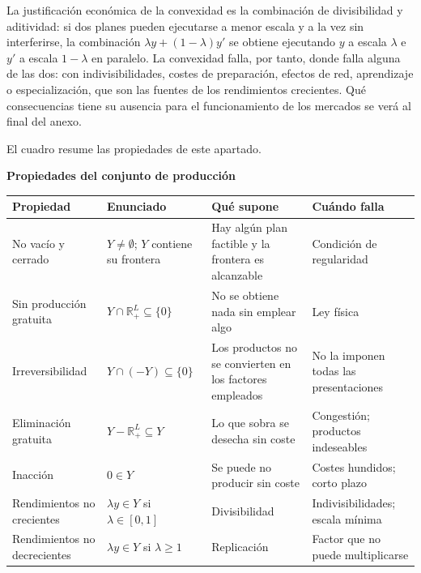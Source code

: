 \documentclass[10pt,a4paper]{article}
\newcounter{anexo}
\begin{document}
La justificación económica de la convexidad es la combinación de divisibilidad y aditividad: si dos planes pueden ejecutarse a menor escala y a la vez sin interferirse, la combinación $\lambda y+(1-\lambda)y'$ se obtiene ejecutando $y$ a escala $\lambda$ e $y'$ a escala $1-\lambda$ en paralelo. La convexidad falla, por tanto, donde falla alguna de las dos: con indivisibilidades, costes de preparación, efectos de red, aprendizaje o especialización, que son las fuentes de los rendimientos crecientes. Qué consecuencias tiene su ausencia para el funcionamiento de los mercados se verá al final del anexo.

El cuadro resume las propiedades de este apartado.

\begin{center}\begin{minipage}{\linewidth}\centering
{\small\textbf{Propiedades del conjunto de producción}}\par\vspace{0.3em}
\footnotesize
\begin{tabular}{p{2.4cm} p{3.0cm} p{4.3cm} p{4.3cm}}
\hline
\raggedright\textbf{Propiedad} & \raggedright\textbf{Enunciado} & \raggedright\textbf{Qué supone} & \raggedright\textbf{Cuándo falla}\tabularnewline
\hline
\raggedright No vacío y cerrado & \raggedright $Y\neq\emptyset$; $Y$ contiene su frontera & \raggedright Hay algún plan factible y la frontera es alcanzable & \raggedright Condición de regularidad\tabularnewline
\raggedright Sin producción gratuita & \raggedright $Y\cap\mathbb R^L_+\subseteq\{0\}$ & \raggedright No se obtiene nada sin emplear algo & \raggedright Ley física\tabularnewline
\raggedright Irreversibilidad & \raggedright $Y\cap(-Y)\subseteq\{0\}$ & \raggedright Los productos no se convierten en los factores empleados & \raggedright No la imponen todas las presentaciones\tabularnewline
\raggedright Eliminación gratuita & \raggedright $Y-\mathbb R^L_+\subseteq Y$ & \raggedright Lo que sobra se desecha sin coste & \raggedright Congestión; productos indeseables\tabularnewline
\raggedright Inacción & \raggedright $0\in Y$ & \raggedright Se puede no producir sin coste & \raggedright Costes hundidos; corto plazo\tabularnewline
\raggedright Rendimientos no crecientes & \raggedright $\lambda y\in Y$ si $\lambda\in[0,1]$ & \raggedright Divisibilidad & \raggedright Indivisibilidades; escala mínima\tabularnewline
\raggedright Rendimientos no decrecientes & \raggedright $\lambda y\in Y$ si $\lambda\ge1$ & \raggedright Replicación & \raggedright Factor que no puede multiplicarse\tabularnewline

\end{tabular}
\end{minipage}
\end{center}
\end{document}
